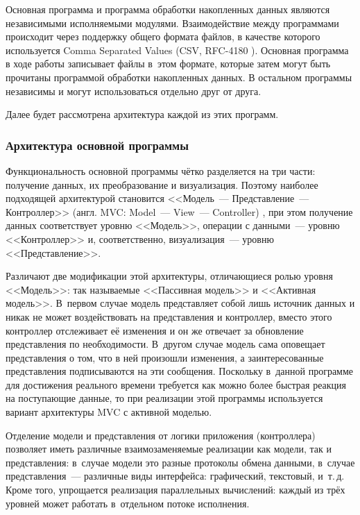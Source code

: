 \documentclass[a4paper, 14pt, titlepage]{extarticle}
\newcommand{\eng}[1]{\foreignlanguage{english}{#1}}
\begin{document}
  Основная программа и программа обработки накопленных данных являются независимыми исполняемыми
  модулями. Взаимодействие между программами происходит через поддержку общего формата файлов, в
  качестве которого используется \eng{Comma Separated Values} (CSV, RFC-4180 \cite{rfc4180}).
  Основная программа в ходе работы записывает файлы в~этом формате, которые затем могут быть прочитаны
  программой обработки накопленных данных. В остальном программы независимы и могут использоваться
  отдельно друг от друга.

  Далее будет рассмотрена архитектура каждой из этих программ.

  \subsubsection{Архитектура основной программы}\label{sssec:main-arch}

  Функциональность основной программы чётко разделяется на три части: получение данных, их
  преобразование и визуализация. Поэтому наиболее подходящей архитектурой становится
  <<Модель~--- Представление~--- Контроллер>> (англ. \eng{MVC: Model~--- View~--- Controller})
  \cite{gamma-patterns}, при этом получение данных соответствует уровню <<Модель>>, операции с
  данными~--- уровню <<Контроллер>> и, соответственно, визуализация~--- уровню <<Представление>>.

  Различают две модификации этой архитектуры, отличающиеся ролью уровня <<Модель>>: так называемые
  <<Пассивная модель>> и <<Активная модель>>. В~первом случае модель представляет собой лишь
  источник данных и никак не может воздействовать на представления и контроллер, вместо этого
  контроллер отслеживает её изменения и он же отвечает за обновление представления по необходимости.
  В~другом случае модель сама оповещает представления о том, что в ней произошли изменения, а
  заинтересованные представления подписываются на эти сообщения. Поскольку в~данной программе для
  достижения реального времени требуется как можно более быстрая реакция на поступающие данные, то
  при реализации этой программы используется вариант архитектуры MVC с активной моделью.

  Отделение модели и представления от логики приложения (контроллера) позволяет иметь различные
  взаимозаменяемые реализации как модели, так и представления: в~случае модели это разные протоколы
  обмена данными, в~случае представления~--- различные виды интерфейса: графический, текстовый, и~т.\,д.
  Кроме того, упрощается реализация параллельных вычислений: каждый из трёх уровней может работать
  в~отдельном потоке исполнения.
\end{document}
